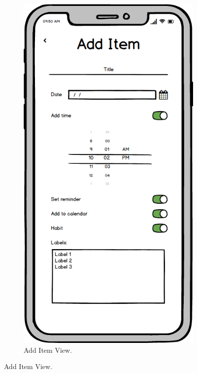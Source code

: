 \begin{figure}
    \centering
    \begin{subfigure}[b]{0.3\textwidth}
        \centering
        \includegraphics[width=\textwidth]{./graphics/design/Add item.png}
        \caption{Add Item View.}

\end{subfigure}
\end{figure}
